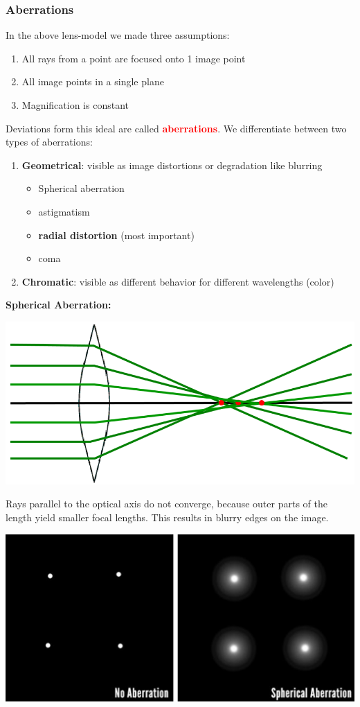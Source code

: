 \documentclass[a4paper, fontsize=8pt, landscape, DIV=1]{scrartcl}
\begin{document}
\begin{multicols*}{4}
		\subsubsection{Aberrations}
		In the above lens-model we made three assumptions:
		\begin{enumerate}[noitemsep]
			\item All rays from a point are focused onto 1 image point
			\item All image points in a single plane
			\item Magnification is constant
		\end{enumerate}
		Deviations form this ideal are called \textcolor{red}{\textbf{aberrations}}. We differentiate between two types of aberrations:
		\begin{enumerate}[noitemsep]
			\item \textbf{Geometrical}: visible as image distortions or degradation like blurring
				\begin{itemize}
					\item Spherical aberration
					\item astigmatism
					\item \textbf{radial distortion} (most important)
					\item coma
				\end{itemize}
			\item \textbf{Chromatic}: visible as different behavior for different wavelengths (color)
		\end{enumerate}
		
		\textbf{Spherical Aberration:}\\
		\begin{center}
			\includegraphics[width=0.7\columnwidth]{images//ImageAcq/spherical_aberration.png}\\
		\end{center}
		Rays parallel to the optical axis do not converge, because outer parts of the length yield smaller focal lengths. This results in blurry edges on the image.
		\begin{center}
			\includegraphics[width=0.7\columnwidth]{images//ImageAcq/spherical_aberration_2.png}\\
		\end{center}
		\vfill\null
		\columnbreak
		

\end{multicols*}
\end{document}
